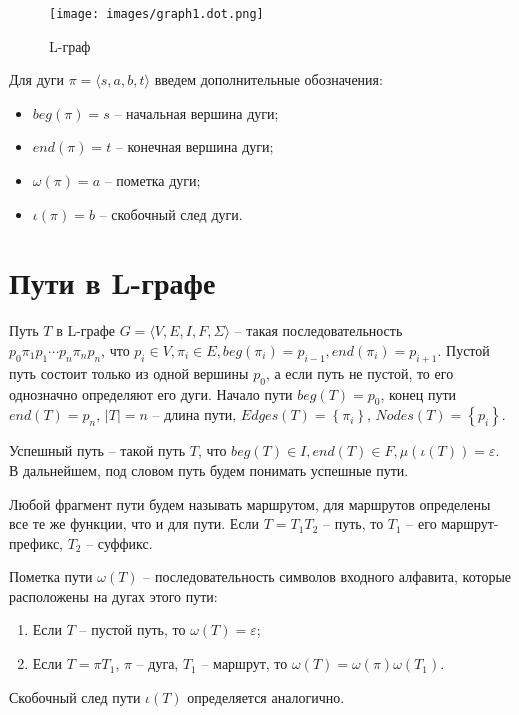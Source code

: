\begin{figure}
    \centering
    \texttt{[image: images/graph1.dot.png]}
    \caption{L-граф}
    \label{lgraph1-expample-image}
    
\end{figure}

Для дуги $\pi = \langle s, a, b, t \rangle$ введем дополнительные обозначения:
\begin{itemize}
    \item $beg(\pi) = s$ -- начальная вершина дуги;
    \item $end(\pi) = t$ -- конечная вершина дуги;
    \item $\omega(\pi) = a$ -- пометка дуги;
    \item $\iota(\pi) = b$ -- скобочный след дуги.
\end{itemize}

\section{Пути в L-графе}
Путь $T$ в L-графе $G=\langle V,E,I,F,\Sigma\rangle$ -- такая последовательность \\ 
$p_0 \pi_1 p_1 \cdots p_n \pi_n p_n$, что 
$p_i \in V, \pi_i \in E, beg(\pi_i) = p_{i-1}, end(\pi_i) = p_{i+1}$.
Пустой путь состоит только из одной вершины $p_0$, а если путь не пустой, то его однозначно определяют его дуги.
Начало пути $beg(T) = p_0$, конец пути $end(T) = p_n$, $\left| T \right| = n$ -- длина пути, 
$Edges(T) = \left\{ \pi_i \right\}$, $Nodes(T) = \left\{ p_i \right\}$.

Успешный путь -- такой путь $T$, что $beg(T) \in I, end(T) \in F, \mu(\iota(T)) = \varepsilon$.
В дальнейшем, под словом путь будем понимать успешные пути.

Любой фрагмент пути будем называть маршрутом, для маршрутов определены все те же функции, что и для пути.
Если $T = T_1 T_2$ -- путь, то $T_1$ -- его маршрут-префикс, $T_2$ -- суффикс.

Пометка пути $\omega(T)$ -- последовательность символов входного алфавита, которые расположены на дугах этого пути:
\begin{enumerate}
    \item Если $T$ -- пустой путь, то $\omega(T) = \varepsilon$;
    \item Если $T = \pi T_1$, $\pi$ -- дуга, $T_1$ -- маршрут, то $\omega(T) = \omega(\pi) \omega(T_1)$.
\end{enumerate}

Скобочный след пути $\iota(T)$ определяется аналогично.

